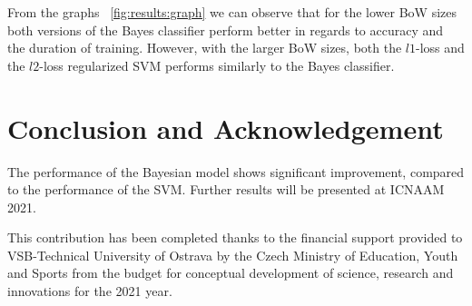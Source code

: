 \documentclass{aip-cp}
\newcommand{\figref}[1]{\figurename~\ref{#1}}
\begin{document}
From the graphs \figref{fig:results:graph} we can observe that for the lower BoW sizes both versions of the Bayes classifier perform better in regards to accuracy and the duration of training. However, with the larger BoW sizes, both the $l1$-loss and the $l2$-loss regularized SVM performs similarly to the Bayes classifier.

\section{Conclusion and Acknowledgement}
The performance of the Bayesian model shows significant improvement, compared to the performance of the SVM. Further results will be presented at ICNAAM 2021.

This contribution has been completed thanks to the financial support provided to VSB-Technical University of Ostrava by the Czech Ministry of Education, Youth and Sports from the budget for conceptual development of science, research and innovations for the 2021 year.



\end{document}
